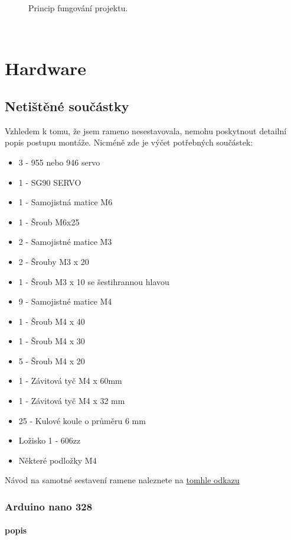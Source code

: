 \documentclass[12pt, a4paper,
twoside,        %
openright
]{report}
\let\oldchapter\chapter
\renewcommand{\chapter}{
	\clearpage
	\pagestyle{fancy}
	\fancyhf{}
	\renewcommand{\headrulewidth}{0pt}
	\fancyfoot[c]{\thepage}
	\
	\oldchapter
}
\renewcommand{\headrulewidth}{0.025pt}
\begin{document}
{\begin{figure}[h]
	
	\caption{Princip fungování projektu.} %
	\label{fig:princip} %
\end{figure}


\chapter{Hardware}
	\section{Netištěné součástky}
Vzhledem k tomu, že jsem rameno nesestavovala, nemohu poskytnout detailní popis postupu montáže. Nicméně zde je výčet potřebných součástek:

\begin{itemize}
	\item	 3 - 955 nebo 946 servo
	\item 	1 - SG90 SERVO
	\item 	1 - Samojistná matice M6
	\item 	1 - Šroub M6x25
	\item 	2 - Samojistné matice M3
	\item 	2 - Šrouby M3 x 20
	\item 	1 - Šroub M3 x 10 se šestihrannou hlavou
	\item 	9 - Samojistné matice M4
	\item 	1 - Šroub M4 x 40
	\item 	1 - Šroub M4 x 30
	\item 	5 - Šroub M4 x 20
	\item 	1 - Závitová tyč M4 x 60mm
	\item 	1 - Závitová tyč M4 x 32 mm
	\item 	25 - Kulové koule o průměru 6 mm
	\item 	Ložisko 1 - 606zz
	\item 	Některé podložky M4
\end{itemize}


Návod na samotné sestavení ramene naleznete na \href{https://www.instructables.com/EEZYbotARM-Mk2-3D-Printed-Robot/}{tomhle odkazu} 
\newpage 


\subsection{Arduino nano 328}
\subsubsection{popis}

}
\end{document}
